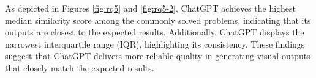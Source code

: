 \documentclass[conference]{IEEEtran}
\begin{document}

As depicted in Figures \ref{fig:rq5} and \ref{fig:rq5-2}, ChatGPT achieves the highest median similarity score among the commonly solved problems, indicating that its outputs are closest to the expected results. Additionally, ChatGPT displays the narrowest interquartile range (IQR), highlighting its consistency. These findings suggest that ChatGPT delivers more reliable quality in generating visual outputs that closely match the expected results.








\end{document}
